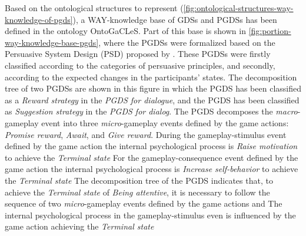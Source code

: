 Based on the ontological structures to represent  (\autoref{fig:ontological-structures-way-knowledge-of-pgds}), a WAY-knowledge base of GDSs and PGDSs has been defined in the ontology OntoGaCLeS. Part of this base is shown in \autoref{fig:portion-way-knowledge-base-pgds}, where the PGDSs were formalized based on the Persuasive System Design (PSD) proposed by . These PGDSs were firstly classified according to the categories of persuasive principles, and secondly, according to the expected changes in the participants' states. The decomposition tree of two PGDSs are shown in this figure in which the PGDS  has been classified as a \emph{Reward strategy} in the \emph{PGDS for dialogue}, and the PGDS  has been classified as \emph{Suggestion strategy} in the \emph{PGDS for dialog}. The PGDS  decomposes the \emph{macro}-gameplay event into three \emph{micro}-gameplay events defined by the game actions: \emph{Promise reward}, \emph{Await}, and \emph{Give reward}. During the gameplay-stimulus event defined by the game action  the internal psychological process is \emph{Raise motivation} to achieve the \emph{Terminal state}  For the gameplay-consequence event defined by the game action  the internal psychological process is \emph{Increase self-behavior} to achieve the \emph{Terminal state}  The decomposition tree of the PGDS  indicates that, to achieve the \emph{Terminal state} of \emph{Being attentive}, it is necessary to follow the sequence of two \emph{micro}-gameplay events defined by the game actions  and  The internal psychological process  in the gameplay-stimulus even is influenced by the game action  achieving the \emph{Terminal state} 

